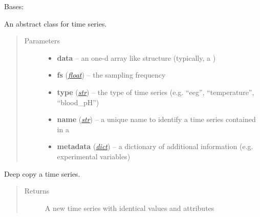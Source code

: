 \documentclass[letterpaper,10pt,english]{sphinxmanual}
\begin{document}

\begin{fulllineitems}
\label{pyrem.time_series:pyrem.time_series.BiologicalTimeSeries}
Bases: \href{http://docs.scipy.org/doc/numpy/reference/generated/numpy.ndarray.html\#numpy.ndarray}{}

An abstract class for time series.
\begin{quote}\begin{description}
\item[{Parameters}] \leavevmode\begin{itemize}
\item {} 
\textbf{data} -- an one-d array like structure (typically, a \href{http://docs.scipy.org/doc/numpy/reference/generated/numpy.ndarray.html\#numpy.ndarray}{})

\item {} 
\textbf{fs} (\href{http://docs.python.org/2.7/library/functions.html\#float}{\emph{float}}) -- the sampling frequency

\item {} 
\textbf{type} (\href{http://docs.python.org/2.7/library/functions.html\#str}{\emph{str}}) -- the type of time series (e.g. ``eeg'', ``temperature'', ``blood\_pH'')

\item {} 
\textbf{name} (\href{http://docs.python.org/2.7/library/functions.html\#str}{\emph{str}}) -- a unique name to identify a time series contained in a {\hyperref[pyrem.polygram:pyrem.polygram.Polygram]{}}

\item {} 
\textbf{metadata} (\href{http://docs.python.org/2.7/library/stdtypes.html\#dict}{\emph{dict}}) -- a dictionary of additional information (e.g. experimental variables)

\end{itemize}

\end{description}\end{quote}

\begin{fulllineitems}
\label{pyrem.time_series:pyrem.time_series.BiologicalTimeSeries.copy}
Deep copy a time series.
\begin{quote}\begin{description}
\item[{Returns}] \leavevmode
A new time series with identical values and attributes


\end{description}
\end{quote}
\end{fulllineitems}
\end{fulllineitems}
\end{document}
